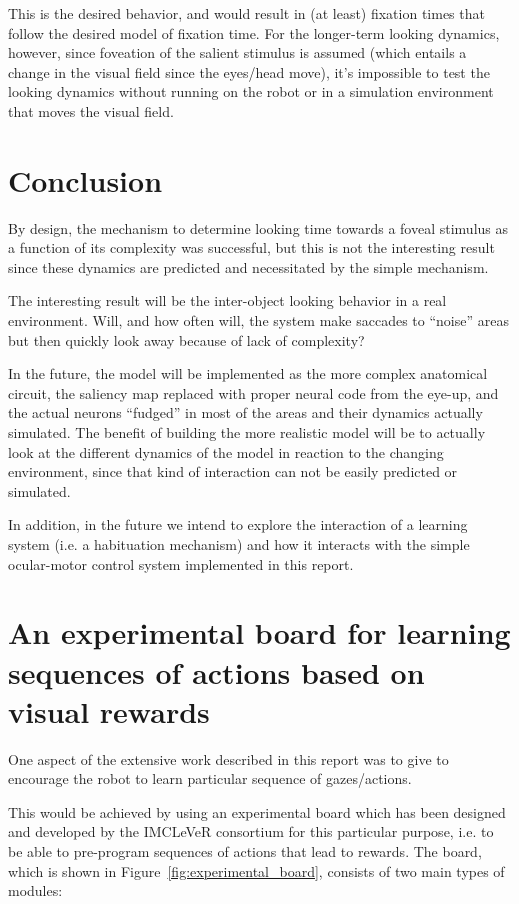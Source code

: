 \documentclass[conference]{IEEEtran}
\begin{document}
This is the desired behavior, and would result in (at least) fixation
times that follow the desired model of fixation time. For the
longer-term looking dynamics, however, since foveation of the salient
stimulus is assumed (which entails a change in the visual field since
the eyes/head move), it's impossible to test the looking dynamics
without running on the robot or in a simulation environment that moves
the visual field.

\section{Conclusion}
By design, the mechanism to determine looking time towards a foveal
stimulus as a function of its complexity was successful, but this is
not the interesting result since these dynamics are predicted and
necessitated by the simple mechanism.

The interesting result will be the inter-object looking behavior in a
real environment. Will, and how often will, the system make saccades
to ``noise'' areas but then quickly look away because of lack of
complexity?

In the future, the model will be implemented as the more complex
anatomical circuit, the saliency map replaced with proper neural code
from the eye-up, and the actual neurons ``fudged'' in most of the
areas and their dynamics actually simulated. The benefit of building
the more realistic model will be to actually look at the different
dynamics of the model in reaction to the changing environment, since
that kind of interaction can not be easily predicted or simulated.

In addition, in the future we intend to explore the interaction of a
learning system (i.e. a habituation mechanism) and how it interacts
with the simple ocular-motor control system implemented in this
report.


\section{An experimental board for learning sequences of actions based on visual rewards}
\label{sec:serial_experimental_board}

One aspect of the extensive work described in this report was to give
to encourage the robot to learn particular sequence of gazes/actions.

This would be achieved by using an experimental board which has been
designed and developed by the IMCLeVeR consortium for this particular
purpose, i.e. to be able to pre-program sequences of actions that lead
to rewards. The board, which is shown in
Figure~\ref{fig:experimental_board}, consists of two main types of
modules:
\end{document}
